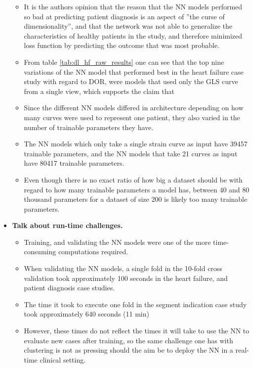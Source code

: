 \begin{itemize}
\begin{itemize}
        \item It is the authors opinion that the reason that the NN models performed so bad at predicting patient diagnosis is an aspect of ''the curse of dimensionality'', and that the network was not able to generalize the characteristics of healthy patients in the study, and therefore minimized loss function by predicting the outcome that was most probable.
        \item From table \ref{tab:dl_hf_raw_results} one can see that the top nine variations of the NN model that performed best in the heart failure case study with regard to DOR, were models that used only the GLS curve from a single view, which supports the claim that 
        \item Since the different NN models differed in architecture depending on how many curves were used to represent one patient, they also varied in the number of trainable parameters they have. 
        \item The NN models which only take a single strain curve as input have 39457 trainable parameters, and the NN models that take 21 curves as input have 80417 trainable parameters.
        \item Even though there is no exact ratio of how big a dataset should be with regard to how many trainable parameters a model has, between 40 and 80 thousand parameters for a dataset of size 200 is likely too many trainable parameters.
    \end{itemize}
    \item \textbf{Talk about run-time challenges.}
    \begin{itemize}
        \item Training, and validating the NN models were one of the more time-consuming computations required.
        \item When validating the NN models, a single fold in the 10-fold cross validation took approximately 100 seconds in the heart failure, and patient diagnosis case studies.
        \item The time it took to execute one fold in the segment indication case study took approximately 640 seconds (11 min)
        \item However, these times do not reflect the times it will take to use the NN to evaluate new cases after training, so the same challenge one has with clustering is not as pressing should the aim be to deploy the NN in a real-time clinical setting.
    \end{itemize}
\end{itemize}

